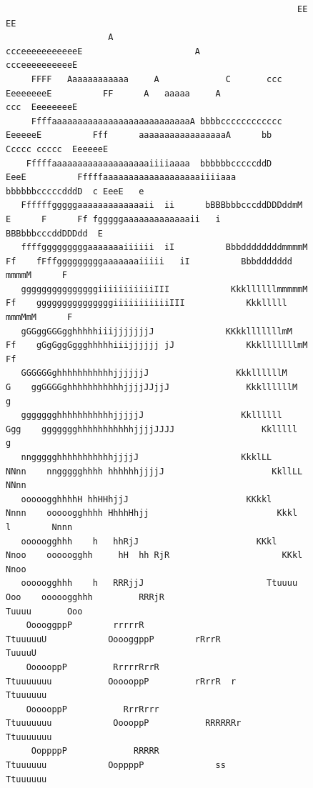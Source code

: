 \documentclass[a4paper,11pt]{article}
\begin{document}
\begin{figure}
    \fontsize{5.5}{5.5}\selectfont
\begin{verbatim}
                                                         EE                                                                  EE
                    A                              ccceeeeeeeeeeeE                      A                              ccceeeeeeeeeeE
     FFFF   Aaaaaaaaaaaa     A             C       ccc  EeeeeeeeE          FF      A   aaaaa     A                     ccc  EeeeeeeeE
     FfffaaaaaaaaaaaaaaaaaaaaaaaaaaaA bbbbcccccccccccc   EeeeeeE          Fff      aaaaaaaaaaaaaaaaaA      bb   Ccccc ccccc  EeeeeeE
    Fffffaaaaaaaaaaaaaaaaaaaiiiiaaaa  bbbbbbcccccddD      EeeE          Fffffaaaaaaaaaaaaaaaaaaaiiiiaaa   bbbbbbcccccdddD  c EeeE   e
   Ffffffgggggaaaaaaaaaaaaaii  ii      bBBBbbbcccddDDDddmM E      F      Ff fgggggaaaaaaaaaaaaaii   i       BBBbbbcccddDDDdd  E
   ffffgggggggggaaaaaaaiiiiii  iI          BbbddddddddmmmmM      Ff    fFffgggggggggaaaaaaaiiiii   iI          Bbbddddddd mmmmM      F
   gggggggggggggggiiiiiiiiiiiIII            KkkllllllmmmmmM      Ff    gggggggggggggggiiiiiiiiiiiIII            Kkklllll mmmMmM      F
   gGGggGGGgghhhhhiiijjjjjjjJ              KKkklllllllmM         Ff    gGgGggGggghhhhhiiijjjjjj jJ              KkklllllllmM         Ff
   GGGGGGghhhhhhhhhhhjjjjjjJ                 KkkllllllM           G    ggGGGGghhhhhhhhhhhjjjjJJjjJ               KkkllllllM           g
   ggggggghhhhhhhhhhhjjjjjJ                   Kkllllll          Ggg    ggggggghhhhhhhhhhhjjjjJJJJ                 Kklllll             g
   nnggggghhhhhhhhhhhjjjjJ                    KkklLL           NNnn    nnggggghhhh hhhhhhjjjjJ                     KkllLL          NNnn
   ooooogghhhhH hhHHhjjJ                       KKkkl           Nnnn    ooooogghhhh HhhhHhjj                         Kkkl  l        Nnnn
   ooooogghhh    h   hhRjJ                       KKkl          Nnoo    ooooogghh     hH  hh RjR                      KKkl          Nnoo
   ooooogghhh    h   RRRjjJ                        Ttuuuu       Ooo    ooooogghhh         RRRjR                         Tuuuu       Ooo
    OoooggppP        rrrrrR                         TtuuuuuU            OoooggppP        rRrrR                           TuuuuU
    OooooppP         RrrrrRrrR                      Ttuuuuuuu           OooooppP         rRrrR  r                       Ttuuuuuu
    OooooppP           RrrRrrr                      Ttuuuuuuu            OoooppP           RRRRRRr                      Ttuuuuuuu
     OoppppP             RRRRR                       Ttuuuuuu            OoppppP              ss                         Ttuuuuuu

\end{verbatim}
\end{figure}
\end{document}
